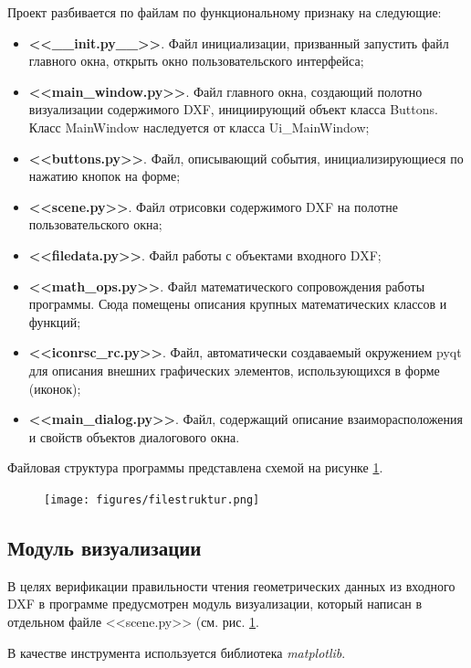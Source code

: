Проект разбивается по файлам по функциональному признаку на следующие:
\begin{itemize}
	\item \textbf{<<\_\_init.py\_\_>>}. Файл инициализации, призванный запустить файл главного окна, открыть окно пользовательского интерфейса;
	\item \textbf{<<main\_window.py>>}. Файл главного окна, создающий полотно визуализации содержимого DXF, инициирующий объект класса Buttons. Класс MainWindow наследуется от класса Ui\_MainWindow;
	\item \textbf{<<buttons.py>>}. Файл, описывающий события, инициализирующиеся по нажатию кнопок на форме; 
	\item \textbf{<<scene.py>>}. Файл отрисовки содержимого DXF на полотне пользовательского окна;
	\item \textbf{<<filedata.py>>}. Файл работы с объектами входного DXF; 
	\item \textbf{<<math\_ops.py>>}. Файл математического сопровождения работы программы. Сюда помещены описания крупных математических классов и функций;
	\item \textbf{<<iconrsc\_rc.py>>}. Файл, автоматически создаваемый окружением pyqt для описания внешних графических элементов, использующихся в форме (иконок);
	\item \textbf{<<main\_dialog.py>>}. Файл, содержащий описание взаиморасположения и свойств объектов диалогового окна.
\end{itemize}

Файловая структура программы представлена схемой на рисунке \ref{fig:filestruktur}.

\begin{figure}[H]
	\centering
	\texttt{[image: figures/filestruktur.png]}
	\label{fig:filestruktur}
\end{figure}

\subsection{Модуль визуализации}

В целях верификации правильности чтения геометрических данных из входного DXF в программе предусмотрен модуль визуализации, который написан в отдельном файле <<scene.py>> (см. рис. \ref{fig:filestruktur}.

В качестве инструмента используется библиотека \textit{matplotlib}.


